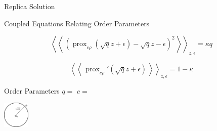\documentclass[pdf]{beamer}
\DeclareMathOperator{\prox}{prox}
\newcommand{\qav}[1]{\mbox{$\left\langle\left\langle \, #1 \, \right\rangle\right\rangle$}}
\begin{document}
\begin{frame}{Replica Solution}


\begin{block}{\begin{center}Coupled Equations Relating Order Parameters\end{center}}
\begin{equation*}
\qav{\left(\prox_{c\rho}{(\sqrt{q} z + \epsilon)} -\sqrt{q}z -\epsilon\right)^2}_{z,\epsilon}= \kappa q
\end{equation*}


\begin{equation*}
\qav{\prox_{c\rho}'(\sqrt{q}z + \epsilon)}_{z, \epsilon} = 1-\kappa
\end{equation*}
\end{block}




\parbox{.40\textwidth}{
\begin{block}{Order Parameters}
$q =$
$c =$
\end{block}
}\parbox{.38\textwidth}{
\begin{center}	\includegraphics[width=0.5in]{errorCircle.pdf}
\end{center}
}




\end{frame}


\end{document}
